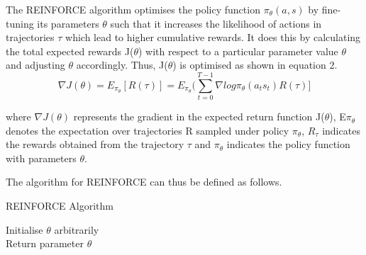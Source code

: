 \documentclass{article}
\begin{document}
\par The REINFORCE algorithm optimises the policy function $\pi_{\theta}(a,s)$ by fine-tuning its parameters $\theta$ such that it increases the likelihood of actions in trajectories $\tau$ which lead to higher cumulative rewards. It does this by calculating the total expected rewards J($\theta$) with respect to a particular parameter value $\theta$ and adjusting $\theta$ accordingly. Thus, J($\theta$) is optimised as shown in equation 2.
\begin{equation}
\nabla J(\theta) = E_{\pi_\theta}[ R(\tau)] =   E_{\pi_\theta} (\sum_{t=0}^{T-1} \nabla log\pi_\theta(a_t s_t) R(\tau)]
\end{equation}

where $\nabla J(\theta)$ represents the gradient in the expected return function J($\theta$), E$\pi_\theta$ denotes the expectation over trajectories R sampled under policy $\pi_\theta$, $R_{\tau}$ indicates the rewards obtained from the trajectory $\tau$ and $\pi_\theta$ indicates the policy function with parameters $\theta$.  \newline

The algorithm for REINFORCE can thus be defined as follows. 
\begin{algorithm}[htbp]
\caption{REINFORCE Algorithm}
\SetAlgoLined
\DontPrintSemicolon
\small %
Initialise $\theta$ arbitrarily\;\\
Return parameter $\theta$
\end{algorithm}
\end{document}
